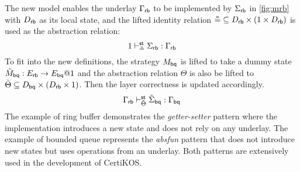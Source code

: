 \documentclass[acmsmall,review,anonymous]{acmart}\settopmatter{printfolios=true,printccs=false,printacmref=false}
\begin{document}
The new model enables the underlay $\Gamma_{ \mathsf{rb} }$
to be implemented
by $\Sigma_{ \mathsf{rb} }$ in \autoref{fig:mrb}
with $D_{ \mathsf{rb} }$ as its local state,
and the lifted identity relation
$ \mathsf{\tilde{=}} \subseteq D_{ \mathsf{rb} } \times (1 \times D_{ \mathsf{rb} })$
is used as the abstraction relation:
\[
  1 \vdash^{ \mathsf{st} }_{ \mathsf{\tilde{=}} } \Sigma_{ \mathsf{rb} } : \Gamma_{ \mathsf{rb} }
\]
To fit into the new definitions,
the strategy $M_{ \mathsf{bq} }$
is lifted to take a dummy state
$\tilde{M}_{ \mathsf{bq} }: E_{ \mathsf{rb} } \rightarrow E_{ \mathsf{bq} }@1$
and the abstraction relation $\Theta$
is also be lifted to
$\tilde{\Theta} \subseteq D_{ \mathsf{bq} } \times (D_{ \mathsf{rb} } \times 1)$.
Then the layer correctness is
updated accordingly.
\[
  \Gamma_{ \mathsf{rb} } \vdash^{ \mathsf{st} }_{\tilde{\Theta}}
  \tilde{\Sigma}_{ \mathsf{bq} } : \Gamma_{ \mathsf{bq} }
\]
The example of ring buffer
demonstrates the \emph{getter-setter} pattern
where the implementation
introduces a new state and does not rely on any underlay.
The example of bounded queue
represents the \emph{absfun} pattern
that does not introduce new states
but uses operations from an underlay.
Both patterns are extensively used in the development
of CertiKOS.

\end{document}
